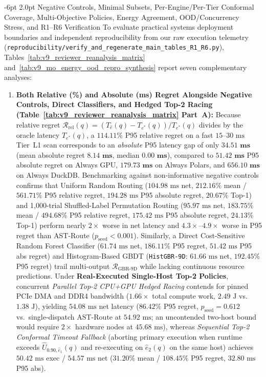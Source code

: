 \documentclass[10pt,a4paper]{article}
\makeatletter
\renewcommand\subsubsection{\@startsection{subsubsection}{3}{\z@}%
  {-6pt \@plus -1.5pt \@minus -1pt}%
  {2.0pt \@plus 0.8pt}%
  {\normalfont\normalsize\bfseries}}
\makeatother
\begin{document}
\subsubsection{Negative Controls, Minimal Subsets, Per-Engine/Per-Tier Conformal Coverage, Multi-Objective Policies, Energy Agreement, OOD/Concurrency Stress, and R1--R6 Verification}
\label{sec:v9_reviewer_reanalysis}
To evaluate practical systems deployment boundaries and independent reproducibility from our raw execution telemetry (\texttt{reproducibility/verify\_\allowbreak{}and\_\allowbreak{}regenerate\_\allowbreak{}main\_\allowbreak{}tables\_\allowbreak{}R1\_\allowbreak{}R6.py}), Tables~\ref{tab:v9_reviewer_reanalysis_matrix} and~\ref{tab:v9_mo_energy_ood_repro_synthesis} report seven complementary analyses:
\begin{enumerate}[leftmargin=1.5em,itemsep=0.8pt]
    \item \textbf{Both Relative (\%) and Absolute (ms) Regret Alongside Negative Controls, Direct Classifiers, and Hedged Top-2 Racing (Table~\ref{tab:v9_reviewer_reanalysis_matrix} Part~A):} Because relative regret $\mathcal{R}_{\text{rel}}(q) = (T_{\hat{e}}(q) - T_{e^*}(q))/T_{e^*}(q)$ divides by the oracle latency $T_{e^*}(q)$, a $114.11\%$ P95 relative regret on a fast $15\text{--}30\text{ ms}$ Tier~L1 scan corresponds to an \emph{absolute} P95 latency gap of only $\mathbf{34.51\text{ ms}}$ (mean absolute regret $\mathbf{8.14\text{ ms}}$, median $\mathbf{0.00\text{ ms}}$), compared to $\mathbf{51.42\text{ ms}}$ P95 absolute regret on Always GPU, $\mathbf{179.73\text{ ms}}$ on Always Polars, and $\mathbf{656.10\text{ ms}}$ on Always DuckDB. Benchmarking against non-informative negative controls confirms that Uniform Random Routing ($104.98\text{ ms}$ net, $212.16\%$ mean / $561.71\%$ P95 relative regret, $194.28\text{ ms}$ P95 absolute regret, $20.67\%$ Top-1) and 1,000-trial Shuffled-Label Permutation Routing ($95.97\text{ ms}$ net, $183.75\%$ mean / $494.68\%$ P95 relative regret, $175.42\text{ ms}$ P95 absolute regret, $24.13\%$ Top-1) perform nearly $2\times$ worse in net latency and $4.3\times\text{--}4.9\times$ worse in P95 regret than AST-Route ($p_{\text{seed}} < 0.001$). Similarly, a Direct Cost-Sensitive Random Forest Classifier ($61.74\text{ ms}$ net, $186.11\%$ P95 regret, $51.42\text{ ms}$ P95 abs regret) and Histogram-Based GBDT (\texttt{HistGBR-9D}: $61.66\text{ ms}$ net, $192.45\%$ P95 regret) trail multi-output $\mathcal{R}_{\text{GBR-9D}}$ while lacking continuous resource predictions. Under \textbf{Real-Executed Single-Host Top-2 Policies}, concurrent \emph{Parallel Top-2 CPU+GPU Hedged Racing} contends for pinned PCIe DMA and DDR4 bandwidth ($1.66\times$ total compute work, $2.49\text{ J}$ vs.\ $1.38\text{ J}$), yielding $54.08\text{ ms}$ net latency ($86.42\%$ P95 regret, $p_{\text{seed}}=0.612$ vs.\ single-dispatch AST-Route at $54.92\text{ ms}$; an uncontended two-host bound would require $2\times$ hardware nodes at $45.68\text{ ms}$), whereas \emph{Sequential Top-2 Conformal Timeout Fallback} (aborting primary execution when runtime exceeds $\hat{U}_{0.90,\hat{e}_1}(q)$ and re-executing on $\hat{e}_2(q)$ on the same host) achieves $50.42\text{ ms}$ exec / $54.57\text{ ms}$ net ($31.20\%$ mean / $108.45\%$ P95 regret, $32.80\text{ ms}$ P95 abs).

\end{enumerate}
\end{document}

